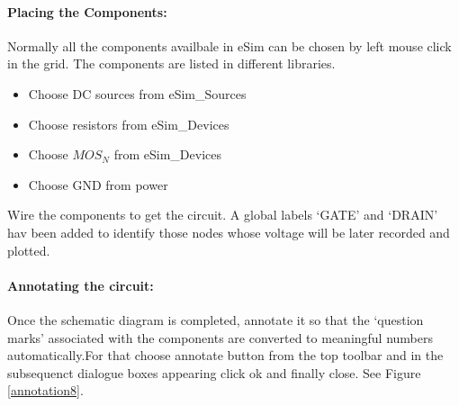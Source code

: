 \paragraph{Placing the Components:} Normally all the components availbale in eSim can be chosen by left mouse click in the grid. The components are listed in different libraries. %


\begin{itemize}
\item
Choose DC sources from eSim\_Sources
\item
Choose resistors from eSim\_Devices
\item
Choose $MOS_N$ from eSim\_Devices
\item
Choose GND from power
\end{itemize}



Wire the components to get the circuit. A global labels `GATE' and `DRAIN' hav been added to identify those nodes whose voltage will be later recorded and plotted.

\paragraph{Annotating the circuit:} Once the schematic diagram is completed, annotate it so that the `question marks' associated with the components are converted to meaningful numbers automatically.For that choose annotate button from the top toolbar%
and in the subsequenct dialogue boxes appearing click ok and finally close. See Figure \ref{annotation8}.




